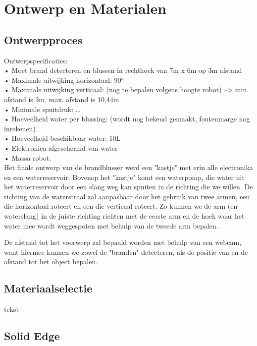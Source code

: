 \documentclass[kulak]{kulakarticle} %
\begin{document}
	
	
	\section{Ontwerp en Materialen}
	\subsection{Ontwerpproces}
	
		Ontwerpspecificaties: \\
	•	Moet brand detecteren en blussen in rechthoek van 7m x 6m op 3m afstand \\
	•	Maximale uitwijking horizontaal: 90°  \\
	•	Maximale uitwijking verticaal: (nog te bepalen volgens hoogte robot) --> min. afstand is 3m, max. afstand is 10,44m \\
	•	Minimale spuitdruk: … \\
	•	Hoeveelheid water per blussing: (wordt nog bekend gemaakt, foutenmarge nog inrekenen) \\
	•	Hoeveelheid beschikbaar water: 10L \\
	•	Elektronica afgeschermd van water \\
	•	Massa robot: \\
	
	
	Het finale ontwerp van de brandblusser werd een "kastje" met erin alle electronika en een waterreservoir. Bovenop het "kastje" komt een waterpomp, die water uit het waterreservoir door een slang weg kan spuiten in de richting die we willen. De richting van de waterstraal zal aanpasbaar door het gebruik van twee armen, een die horizontaal roteert en een die verticaal roteert. Zo kunnen we de arm (en waterslang) in de juiste richting richten met de eerste arm en de hoek waar het water mee wordt weggespoten met behulp van de tweede arm bepalen. 
	
	De afstand tot het voorwerp zal bepaald worden met behulp van een webcam, want hiermee kunnen we zowel de "branden" detecteren, als de positie van en de afstand tot het object bepalen.
	
	
	\subsection{Materiaalselectie}
	
	tekst
	
	
	\subsection{Solid Edge}
	
\end{document}

